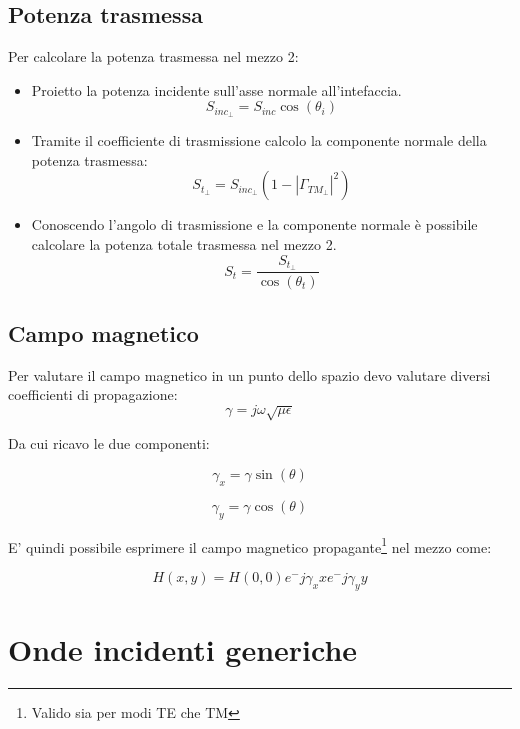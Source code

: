 \documentclass[10pt,a4paper]{report}
\begin{document}
		\subsection{Potenza trasmessa}

			Per calcolare la potenza trasmessa nel mezzo 2:
			
			\begin{itemize}
			
			\item Proietto la potenza incidente sull'asse normale all'intefaccia.
			\begin{equation}
			S_{inc_\perp}=S_{inc}\cos(\theta_i)
			\end{equation}

			\item Tramite il coefficiente di trasmissione calcolo la componente normale della potenza trasmessa:
			\begin{equation}
			S_{t_\perp}=S_{inc_\perp}(1-|\Gamma_{TM_\perp}|^2)
			\end{equation}

			\item Conoscendo l'angolo di trasmissione e la componente normale è possibile calcolare la potenza totale trasmessa nel mezzo 2.
			\begin{equation}
			S_{t}=\frac{S_{t_\perp}}{\cos(\theta_t)}
			\end{equation}
			

			\end{itemize}
		

		\subsection{Campo magnetico}

			Per valutare il campo magnetico in un punto dello spazio devo valutare diversi coefficienti di propagazione:
			\[
			\gamma=j\omega\sqrt{\mu\epsilon}\]

			Da cui ricavo le due componenti:

			\[
			\gamma_x=\gamma\sin(\theta)
			\]

			\[
			\gamma_y=\gamma\cos(\theta)
			\]

			E' quindi possibile esprimere il campo magnetico propagante\footnote{Valido sia per modi TE che TM} nel mezzo come:
			
			\[
			H(x,y)=H(0,0)e^-{j\gamma_x x}e^-{j\gamma_y y}
			\]
		

		\section{Onde incidenti generiche}
\end{document}
